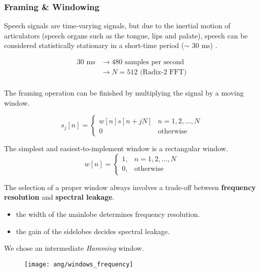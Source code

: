 
\begin{frame}
\frametitle{Framing \& Windowing}
Speech signals are time-varying signals, but due to the inertial motion of articulators (speech organs such as the tongue, lips and palate), speech can be considered statistically stationary in a short-time period ($\sim$ 30 ms) \cite{brandstein1995practical}.

\begin{align*}
30 \text{ ms} &\longrightarrow 480 \text{ samples per second}\\
&\longrightarrow N = 512 \text{ (Radix-2 FFT)}\\
\end{align*}
\end{frame}


\begin{frame}
The framing operation can be finished by multiplying the signal by a moving window.

\begin{equation}
s_j[n] =
\begin{cases}
w[n] s[n+jN] & n = 1, 2, \dots, N\\
0 & \text{otherwise}
\end{cases}
\end{equation}

The simplest and easiest-to-implement window is a rectangular window.
\begin{equation}
w[n] =
\begin{cases}
1, & n = 1, 2, \dots, N\\
0, & \text{otherwise}
\end{cases}
\end{equation}
\end{frame}


\begin{frame}
The selection of a proper window always involves a trade-off between \textbf{frequency resolution} and \textbf{spectral leakage}.

\begin{itemize}
\item the width of the mainlobe determines frequency resolution.
\item the gain of the sidelobes decides spectral leakage.
\end{itemize}
We chose an intermediate \textit{Hamming} window.

\begin{figure}[H]
\centering
\texttt{[image: ang/windows\_frequency]}
\end{figure}
\end{frame}

